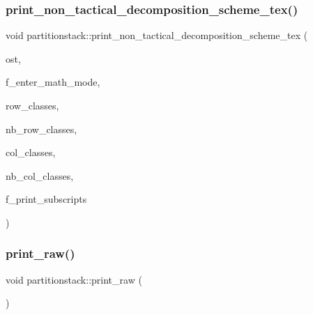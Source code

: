 \subsubsection{\texorpdfstring{print\+\_\+non\+\_\+tactical\+\_\+decomposition\+\_\+scheme\+\_\+tex()}{print\_non\_tactical\_decomposition\_scheme\_tex()}}
{\footnotesize\ttfamily void partitionstack\+::print\+\_\+non\+\_\+tactical\+\_\+decomposition\+\_\+scheme\+\_\+tex (\begin{DoxyParamCaption}\item[{ostream \&}]{ost,  }\item[{\mbox{\hyperlink{galois_8h_a09fddde158a3a20bd2dcadb609de11dc}{I\+NT}}}]{f\+\_\+enter\+\_\+math\+\_\+mode,  }\item[{\mbox{\hyperlink{galois_8h_a09fddde158a3a20bd2dcadb609de11dc}{I\+NT}} $\ast$}]{row\+\_\+classes,  }\item[{\mbox{\hyperlink{galois_8h_a09fddde158a3a20bd2dcadb609de11dc}{I\+NT}}}]{nb\+\_\+row\+\_\+classes,  }\item[{\mbox{\hyperlink{galois_8h_a09fddde158a3a20bd2dcadb609de11dc}{I\+NT}} $\ast$}]{col\+\_\+classes,  }\item[{\mbox{\hyperlink{galois_8h_a09fddde158a3a20bd2dcadb609de11dc}{I\+NT}}}]{nb\+\_\+col\+\_\+classes,  }\item[{\mbox{\hyperlink{galois_8h_a09fddde158a3a20bd2dcadb609de11dc}{I\+NT}}}]{f\+\_\+print\+\_\+subscripts }\end{DoxyParamCaption})}

\mbox{\label{classpartitionstack_a733493f93dd83b5cef67908fc42a4312}} 
\subsubsection{\texorpdfstring{print\+\_\+raw()}{print\_raw()}}
{\footnotesize\ttfamily void partitionstack\+::print\+\_\+raw (\begin{DoxyParamCaption}{ }\end{DoxyParamCaption})}

\mbox{\label{classpartitionstack_a239ac35b37e27fa76927b9d1b542cc16}} 
